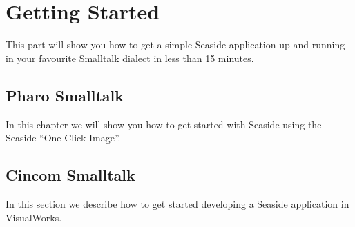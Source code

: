 \documentclass[10pt,twoside,english]{root/support/latex/sbabook/sbabook}
\begin{document}
\fi



\part{Getting Started}


This part will show you how to get a simple Seaside application up and running in your favourite Smalltalk dialect in less than 15 minutes.

\chapter{Pharo Smalltalk}
In this chapter we will show you how to get started with Seaside using the Seaside “One Click Image”.


\chapter{Cincom Smalltalk}
In this section we describe how to get started developing a Seaside application in VisualWorks.





\ifx\wholebook\relax\else
\end{document}
